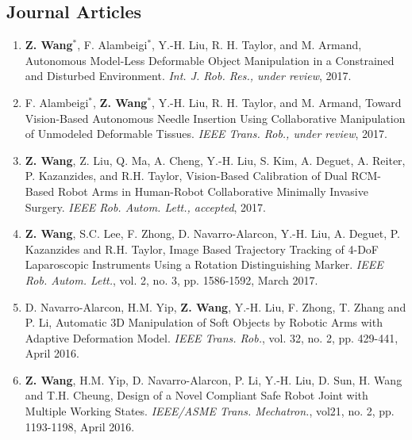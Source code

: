 \documentclass[10pt,letterpaper]{article}
\begin{document}
\subsection*{Journal Articles}
\begin{enumerate}
    \item \textbf{Z. Wang}$^*$, F. Alambeigi$^*$, Y.-H. Liu, R. H. Taylor, and M. Armand,
    Autonomous Model-Less Deformable Object Manipulation in a Constrained and Disturbed Environment.
    \textit{Int. J. Rob. Res., under review}, 2017.
    \item F. Alambeigi$^*$, \textbf{Z. Wang}$^*$, Y.-H. Liu, R. H. Taylor, and M. Armand,
    Toward Vision-Based Autonomous Needle Insertion Using Collaborative Manipulation of Unmodeled Deformable Tissues.
    \textit{IEEE Trans. Rob., under review}, 2017.
    \item \textbf{Z. Wang}, Z. Liu, Q. Ma, A. Cheng, Y.-H. Liu, S. Kim, A. Deguet, A. Reiter, P. Kazanzides, and R.H. Taylor,
    Vision-Based Calibration of Dual RCM-Based Robot Arms in Human-Robot Collaborative Minimally Invasive Surgery.
    \textit{IEEE Rob. Autom. Lett., accepted}, 2017.
    \item \textbf{Z. Wang}, S.C. Lee, F. Zhong, D. Navarro-Alarcon, Y.-H. Liu, A. Deguet, P. Kazanzides and R.H. Taylor,
    Image Based Trajectory Tracking of 4-DoF Laparoscopic Instruments Using a Rotation Distinguishing Marker.
    \textit{IEEE Rob. Autom. Lett.}, vol. 2, no. 3, pp. 1586-1592, March 2017.
    \item D. Navarro-Alarcon, H.M. Yip, \textbf{Z. Wang}, Y.-H. Liu, F. Zhong, T. Zhang and P. Li,
    Automatic 3D Manipulation of Soft Objects by Robotic Arms with Adaptive Deformation Model.
    \textit{{IEEE} Trans. Rob.}, vol. 32, no. 2, pp. 429-441, April 2016.
    \item \textbf{Z. Wang}, H.M. Yip, D. Navarro-Alarcon, P. Li, Y.-H. Liu, D. Sun, H. Wang and T.H. Cheung,
    Design of a Novel Compliant Safe Robot Joint with Multiple Working States.
    \textit{{IEEE/ASME} Trans. Mechatron.}, vol21, no. 2, pp. 1193-1198, April 2016.
\end{enumerate}
\end{document}
